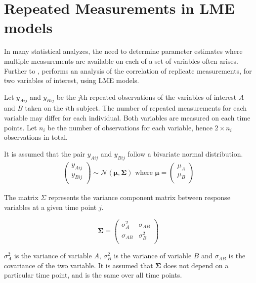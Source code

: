 \documentclass[12pt, a4paper]{report}
\theoremstyle{plain}
\theoremstyle{definition}
\theoremstyle{remark}
\begin{document}
	
	

	\section{Repeated Measurements in LME models}
	
	In many statistical analyzes, the need to determine parameter estimates where multiple measurements are available on each of a set of variables often arises. Further to \citet{lam}, \citet{hamlett} performs an analysis of the correlation of replicate measurements, for two variables of interest, using LME models.
	
	Let $y_{Aij}$ and $y_{Bij}$ be the $j$th repeated observations of the variables of interest $A$ and $B$ taken on the $i$th subject. The number of repeated measurements for each variable may differ for each individual.
	Both variables are measured on each time points. Let $n_{i}$ be the number of observations for each variable, hence $2\times n_{i}$ observations in total.
	
	It is assumed that the pair $y_{Aij}$ and $y_{Bij}$ follow a bivariate normal distribution.
	\begin{eqnarray*}
		\left(
		\begin{array}{c}
			y_{Aij} \\
			y_{Bij} \\
		\end{array}
		\right) \sim \mathcal{N}(
		\boldsymbol{\mu}, \boldsymbol{\Sigma})\mbox{   where } \boldsymbol{\mu} = \left(
		\begin{array}{c}
			\mu_{A} \\
			\mu_{B} \\
		\end{array}
		\right)
	\end{eqnarray*}
	
	The matrix $\Sigma$ represents the variance component matrix between response variables at a given time point $j$.
	
	\[
	\boldsymbol{\Sigma} = \left( \begin{array}{cc}
	\sigma^2_{A} & \sigma_{AB} \\
	\sigma_{AB} & \sigma^2_{B}\\
	\end{array}   \right)
	\]
	
	$\sigma^2_{A}$ is the variance of variable $A$, $\sigma^2_{B}$ is the variance of variable $B$ and $\sigma_{AB}$ is the covariance of the two variable. It is assumed that $\boldsymbol{\Sigma}$ does not depend on a particular time point, and is the same over all time points.
	
	
	
	
	
	
	
	
\end{document}

